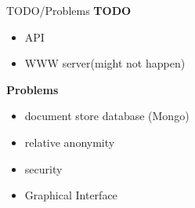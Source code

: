 \documentclass[11pt]{beamer}
\begin{document}
\begin{frame}{TODO/Problems}
	\textbf{TODO}\\
		\begin{itemize}
		\item API
		\item WWW server(might not happen)
		\end{itemize}
	\textbf{Problems}
	\begin{itemize}
		\item document store database (Mongo)
		\item relative anonymity
		\item security
		\item Graphical Interface
	\end{itemize}
\end{frame}
\end{document}
